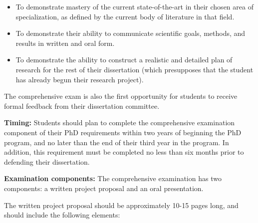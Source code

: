 \begin{itemize}
\item To demonstrate mastery of the current state-of-the-art in their
  chosen area of specialization, as defined by the current body of
  literature in that field.

\item To demonstrate their ability to communicate scientific goals,
  methods, and results in written and oral form. 

\item To demonstrate the ability to construct a realistic and detailed
  plan of research for the rest of their dissertation (which
  presupposes that the student has already begun their research project).

\end{itemize}

The comprehensive exam is also the first opportunity for students to
receive formal feedback from their dissertation committee.

\vspace{2mm}
\noindent
\textbf{Timing:} Students should plan to complete the comprehensive
examination component of their PhD requirements within two years of
beginning the PhD program, and no later than the end of their third
year in the program.  In addition, this requirement must be completed
no less than six months prior to defending their dissertation. 


\vspace{2mm}
\noindent
\textbf{Examination components:} The comprehensive examination has two components: a written project proposal and an oral presentation.

The written project proposal should be approximately 10-15 pages long, and should include the following elements:

